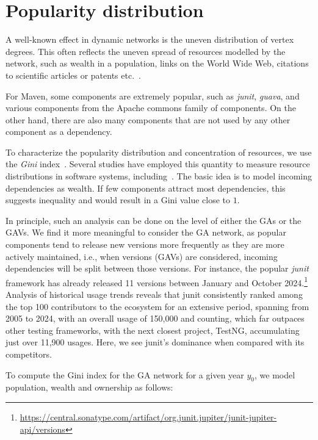\documentclass[10pt,conference]{IEEEtran}
\begin{document}
\section{Popularity distribution}
\label{section:popularity}

A well-known effect in dynamic networks is the uneven
distribution of vertex degrees. This often reflects the uneven
spread of resources modelled by the network, such as
wealth in a population, links on the World Wide Web, citations
to scientific articles or patents etc.~\cite{albert2002network,
boccaletti2006network,vespignani2012network}.

For Maven, some components are extremely popular, such as
\textit{junit}, \textit{guava}, and various components from the
Apache commons family of components. On the other hand, there
are also many components that are not used by any other
component as a dependency. 

To characterize the popularity distribution and concentration of resources, we use
the \textit{Gini} index~\cite{dorfman1979gini}. Several studies
have employed this quantity to measure resource distributions in
software systems, including~\cite{decan2019empirical,
goloshchapova2013application,chelkowski2016inequalities,
wu2017gini}. The basic idea is to model incoming dependencies
as wealth. If few components attract most dependencies, this
suggests inequality and would result in a Gini value close
to $1$. 

In principle, such an analysis can be done on the level of either
the GAs or the GAVs. We find it more meaningful to consider the
GA network, as popular components tend to release new versions
more frequently as they are more actively maintained, i.e., when
versions (GAVs) are considered, incoming dependencies will be
split between those versions.  For instance, the popular
\textit{junit} framework has already released 11 versions between
January and October
2024.\footnote{\url{https://central.sonatype.com/artifact/org.junit.jupiter/junit-jupiter-api/versions}} Analysis of historical usage trends reveals that junit consistently ranked among the top 100 contributors to the ecosystem for an extensive period, spanning from 2005 to 2024, with an overall usage of 150,000 and counting, which far outpaces other testing frameworks, with the next closest project, TestNG, accumulating just over 11,900 usages. Here, we see junit's dominance when compared with its competitors.

To compute the Gini index for the GA network for a given year
$y_0$, we model population, wealth and ownership as follows:
\end{document}
